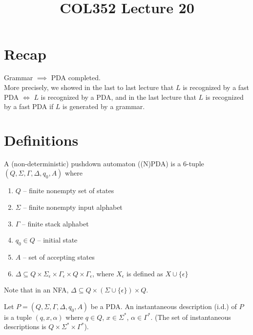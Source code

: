 \documentclass[a4paper]{article}
\title{\textbf{COL352 Lecture 20}}
\date{}
\newcommand{\nl}{\vspace{0.2cm}\\}
\begin{document}
\maketitle
\tableofcontents

\section{Recap}

Grammar $\implies$ PDA completed.\nl
More precisely, we showed in the last to last lecture that $L$ is recognized by a fast PDA $\iff$ $L$ is recognized by a PDA, and in the last lecture that $L$ is recognized by a fast PDA if $L$ is
generated by a grammar.

\section{Definitions}

\begin{defn}
    A (non-deterministic) pushdown automaton ((N)PDA) is a 6-tuple $(Q, \Sigma, \Gamma, \Delta, q_0, A)$ where
    \begin{enumerate}
        \item $Q$ -- finite nonempty set of states
        \item $\Sigma$ -- finite nonempty input alphabet
        \item $\Gamma$ -- finite stack alphabet
        \item $q_0 \in Q$ -- initial state
        \item $A$ -- set of accepting states
        \item $\Delta \subseteq Q \times \Sigma_\epsilon \times \Gamma_\epsilon \times Q \times \Gamma_\epsilon$, where $X_\epsilon$ is defined as $X \cup \{\epsilon\}$
    \end{enumerate}
\end{defn}

Note that in an NFA, $\Delta \subseteq Q \times (\Sigma \cup \{\epsilon\}) \times Q$.

\begin{defn}
    Let $P = (Q, \Sigma, \Gamma, \Delta, q_0, A)$ be a PDA. An instantaneous description (i.d.) of $P$ is a tuple $(q, x, \alpha)$ where $q \in Q$, $x \in \Sigma^*$, $\alpha \in \Gamma^*$. (The set
    of instantaneous descriptions is $Q \times \Sigma^* \times \Gamma^*$).
\end{defn}
\end{document}

